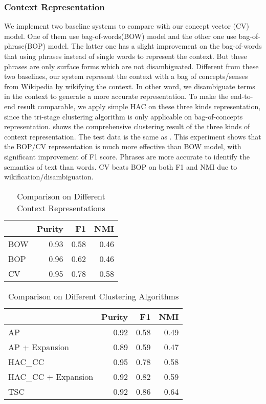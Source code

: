 \subsubsection{Context Representation}
We implement two baseline systems to compare with our concept vector (CV) model.
One of them use bag-of-words(BOW) model and the other one use bag-of-phrase(BOP) model.
The latter one has a slight improvement on the bag-of-words that using
phrases instead of single words to represent the context. But these phrases
are only surface forms which are not disambiguated. Different from these two
baselines, our system represent the context with a bag of concepts/senses from
Wikipedia by wikifying the context. In other word, we disambiguate terms
in the context to generate a more accurate representation.
To make the end-to-end result comparable,
we apply simple HAC on these three kinds representation,
since the tri-stage clustering algorithm is only applicable on bag-of-concepts
representation.  shows
the comprehensive clustering result of the three kinds of context representation.
The test data is the same as .
This experiment shows that the BOP/CV representation is much more effective than
BOW model, with significant improvement of F1 score. Phrases are more
accurate to identify the semantics of text than words. CV beats BOP
on both F1 and NMI due to wikification/disambiguation.

\begin{table}[th]
\centering
\caption{Comparison on Different Context Representations}
\small
\begin{tabular}{|l|r|r|r|}
\hline
     &       {\bf Purity} &         {\bf F1} &        {\bf NMI} \\
\hline
       BOW &      0.93      &      0.58      &      0.46      \\
\hline
       BOP &      0.96      &      0.62      &      0.46      \\
\hline
       CV &      0.95      &     0.78   &       0.58\\
\hline
\end{tabular}
\label{tab:represent}
\end{table}

\begin{table}[th]
\centering
\small
\caption{Comparison on Different Clustering Algorithms}
\begin{tabular}{|l|r|r|r|}
\hline
     &       {\bf Purity} &  {\bf F1} &   {\bf NMI} \\
\hline
       AP  &        0.92 &   	0.58 &	      0.49\\
\hline
       AP + Expansion  &    0.89 &       0.59 &        0.47 \\
\hline
        HAC\_CC &       0.95 &       0.78 &        0.58 \\
\hline
        HAC\_CC + Expansion &   0.92 &       0.82 &        0.59\\
\hline
       TSC &       0.92 &       0.86 &        0.64\\
\hline
\end{tabular}
\label{tab:clusteringeval}
\end{table}

